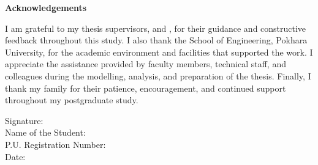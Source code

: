\begin{titlepage}
    \vspace*{28pt}
    \vspace{10pt}

    \begin{center}
        {\fontsize{16}{20}\selectfont \textbf{Acknowledgements}}
    \end{center}

    \vspace{14pt}
    \vspace{10pt}

    {\fontsize{12}{18}\selectfont
    \noindent
    I am grateful to my thesis supervisors, \mySupervisorOneName{} and \mySupervisorTwoName, for their guidance and constructive feedback throughout this study. I also thank the School of Engineering, Pokhara University, for the academic environment and facilities that supported the work. I appreciate the assistance provided by faculty members, technical staff, and colleagues during the modelling, analysis, and preparation of the thesis. Finally, I thank my family for their patience, encouragement, and continued support throughout my postgraduate study.
    }

    \vspace*{42pt}
    \vspace{10pt}

    \begin{flushleft}
        {\fontsize{12}{18}\selectfont
        Signature: \underline{\hspace{5cm}} \\[12pt]
        Name of the Student: \myStudentName \\[12pt]
        P.U. Registration Number: \myRegistrationNumber \\[12pt]
        Date: \underline{\hspace{5cm}}
        }
    \end{flushleft}

\end{titlepage}
